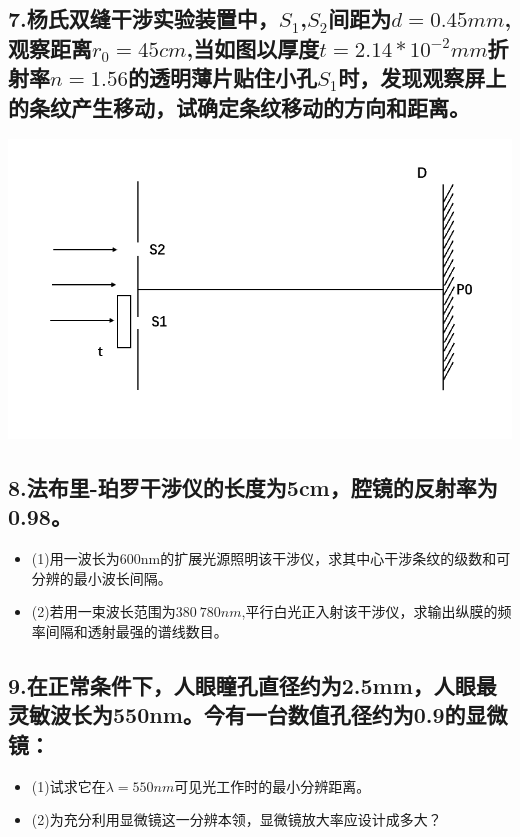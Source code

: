 \documentclass[11pt,a4paper]{article}
\begin{document}
    \subsection*{7.杨氏双缝干涉实验装置中，$S_1$,$S_2$间距为$d=0.45mm$,观察距离$r_0=45cm$,当如图以厚度$t=2.14*10^{-2}mm$折射率$n=1.56$的透明薄片贴住小孔$S_1$时，发现观察屏上的条纹产生移动，试确定条纹移动的方向和距离。}
    \includegraphics[scale=0.3]{2.png}%
    \vspace{10mm}
    \subsection*{8.法布里-珀罗干涉仪的长度为5cm，腔镜的反射率为0.98。}
    \begin{itemize}
        \vspace{0mm}
        \item (1)用一波长为600nm的扩展光源照明该干涉仪，求其中心干涉条纹的级数和可分辨的最小波长间隔。
        \vspace{0mm}
        \item (2)若用一束波长范围为$380~780nm$,平行白光正入射该干涉仪，求输出纵膜的频率间隔和透射最强的谱线数目。
        \vspace{0mm}
    \end{itemize}
    \vspace{20mm}
    \subsection*{9.在正常条件下，人眼瞳孔直径约为2.5mm，人眼最灵敏波长为550nm。今有一台数值孔径约为0.9的显微镜：}
    \begin{itemize}
        \vspace{0mm}
        \item (1)试求它在$\lambda =550nm$可见光工作时的最小分辨距离。
        \vspace{0mm}
        \item (2)为充分利用显微镜这一分辨本领，显微镜放大率应设计成多大？
    \end{itemize}
    \vspace{20mm}
\end{document}
